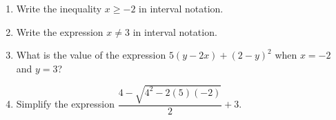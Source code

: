 \documentclass{article}
\begin{document}
\begin{enumerate}


\item Write the inequality $x\ge -2$ in interval notation. 

        \begin{enumerate}
        \end{enumerate}

\item Write the expression $x\neq 3$ in interval notation. 

        \begin{enumerate}
        \begin{multicols}{4}
          \item $(-\infty,3) \cup (3,\infty)$ %
          \item $(3, \infty)$ 
          \item $(-\infty,3)$
          \item $(-\infty, 3] \cup [3, \infty)$ 
        \end{multicols}
        \end{enumerate}



\item What is the value of the expression $5(y-2x)+(2-y)^2$ when $x=-2$ and $y=3$?

  \begin{enumerate}
  \end{enumerate}


\item Simplify the expression $\dfrac{4-\sqrt{4^{2}-2(5)(-2)}}{2}+3$.

  \begin{enumerate}
  \end{enumerate}


\end{enumerate}
\end{document}
